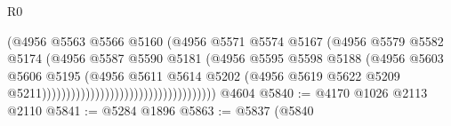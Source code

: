 \begin{lexlean}{R0}
\begin{coremodule}
                                                            (@4956
                                                              @5563
                                                              @5566
                                                              @5160
                                                              (@4956
                                                                @5571
                                                                @5574
                                                                @5167
                                                                (@4956
                                                                  @5579
                                                                  @5582
                                                                  @5174
                                                                  (@4956
                                                                    @5587
                                                                    @5590
                                                                    @5181
                                                                    (@4956
                                                                      @5595
                                                                      @5598
                                                                      @5188
                                                                      (@4956
                                                                        @5603
                                                                        @5606
                                                                        @5195
                                                                        (@4956
                                                                          @5611
                                                                          @5614
                                                                          @5202
                                                                          (@4956
                                                                            @5619
                                                                            @5622
                                                                            @5209
                                                                            @5211))))))))))))))))))))))))))))))))))))
    @4604
@5840 := @4170 @1026 @2113 @2110
@5841 := @5284 @1896
@5863 := @5837
    (@5840

\end{coremodule}
\end{lexlean}
